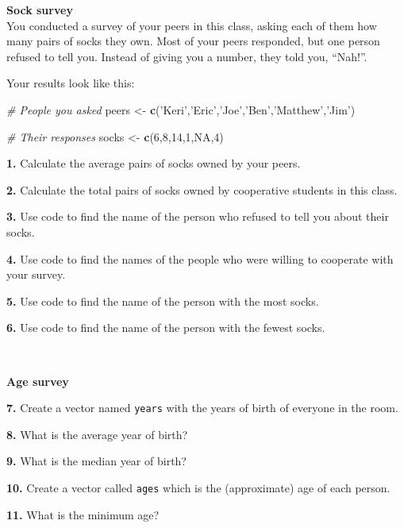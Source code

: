 \documentclass[]{book}
\newenvironment{Shaded}{\begin{snugshade}}{\end{snugshade}}
\newcommand{\CommentTok}[1]{\textcolor[rgb]{0.56,0.35,0.01}{\textit{#1}}}
\newcommand{\DecValTok}[1]{\textcolor[rgb]{0.00,0.00,0.81}{#1}}
\newcommand{\KeywordTok}[1]{\textcolor[rgb]{0.13,0.29,0.53}{\textbf{#1}}}
\newcommand{\NormalTok}[1]{#1}
\newcommand{\OtherTok}[1]{\textcolor[rgb]{0.56,0.35,0.01}{#1}}
\newcommand{\StringTok}[1]{\textcolor[rgb]{0.31,0.60,0.02}{#1}}
\begin{document}
\textbf{Sock survey}\\
You conducted a survey of your peers in this class, asking each of them how many pairs of socks they own. Most of your peers responded, but one person refused to tell you. Instead of giving you a number, they told you, ``Nah!''.

Your results look like this:

\begin{Shaded}
\begin{Highlighting}[]
\CommentTok{# People you asked}
\NormalTok{peers <-}\StringTok{ }\KeywordTok{c}\NormalTok{(}\StringTok{'Keri'}\NormalTok{,}\StringTok{'Eric'}\NormalTok{,}\StringTok{'Joe'}\NormalTok{,}\StringTok{'Ben'}\NormalTok{,}\StringTok{'Matthew'}\NormalTok{,}\StringTok{'Jim'}\NormalTok{)}

\CommentTok{# Their responses}
\NormalTok{socks <-}\StringTok{ }\KeywordTok{c}\NormalTok{(}\DecValTok{6}\NormalTok{,}\DecValTok{8}\NormalTok{,}\DecValTok{14}\NormalTok{,}\DecValTok{1}\NormalTok{,}\OtherTok{NA}\NormalTok{,}\DecValTok{4}\NormalTok{)}
\end{Highlighting}
\end{Shaded}

\textbf{1.} Calculate the average pairs of socks owned by your peers.

\textbf{2.} Calculate the total pairs of socks owned by cooperative students in this class.

\textbf{3.} Use code to find the name of the person who refused to tell you about their socks.

\textbf{4.} Use code to find the names of the people who were willing to cooperate with your survey.

\textbf{5.} Use code to find the name of the person with the most socks.

\textbf{6.} Use code to find the name of the person with the fewest socks.

~

\textbf{Age survey}

\textbf{7.} Create a vector named \texttt{years} with the years of birth of everyone in the room.

\textbf{8.} What is the average year of birth?

\textbf{9.} What is the median year of birth?

\textbf{10.} Create a vector called \texttt{ages} which is the (approximate) age of each person.

\textbf{11.} What is the minimum age?
\end{document}
